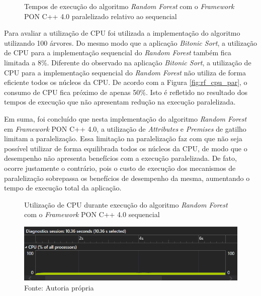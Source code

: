 \begin{figure}[!htb]
\centering
{}
\caption{Tempos de execução do algoritmo \textit{Random
Forest} com o \textit{Framework} PON C++ 4.0 paralelizado relativo ao sequencial}
\label{fig:random_forest_rel}
\end{figure}

Para avaliar a utilização de CPU foi utilizada a implementação do algoritmo
utilizando 100 árvores. Do mesmo modo que a aplicação \textit{Bitonic Sort}, a
utilização de CPU para a implementação sequencial do \textit{Random Forest}
também fica limitada a 8\%. Diferente do observado na aplicação \textit{Bitonic
Sort}, a utilização de CPU para a implementação sequencial do \textit{Random
Forest} não utiliza de forma eficiente todos os núcleos da CPU. De acordo com a
Figura \ref{fig:rf_cpu_par}, o consumo de CPU fica próximo de apenas 50\%. Isto
é refletido no resultado dos tempos de execução que não apresentam redução na
execução paralelizada.

Em suma, foi concluído que nesta implementação do algoritmo \textit{Random
Forest} em \textit{Framework} PON C++ 4.0, a utilização de \textit{Attributes} e
\textit{Premises} de gatilho limitam a paralelização. Essa limitação na
paralelização faz com que não seja possível utilizar de forma equilibrada todos
os núcleos da CPU, de modo que o desempenho não apresenta benefícios com a
execução paralelizada. De fato, ocorre justamente o contrário, pois o custo de
execução dos mecanismos de paralelização sobrepassa os benefícios de desempenho
da  mesma, aumentando o tempo de execução total da aplicação.

\begin{figure}[!htb]
\centering
\caption{Utilização de CPU durante execução do algoritmo \textit{Random Forest}
com o \textit{Framework} PON C++ 4.0 sequencial}
\includegraphics[width=\textwidth]{../figures/cpu_rf.png}
\smallskip
\caption*{Fonte: Autoria própria}
\label{fig:rf_cpu}
\end{figure}

